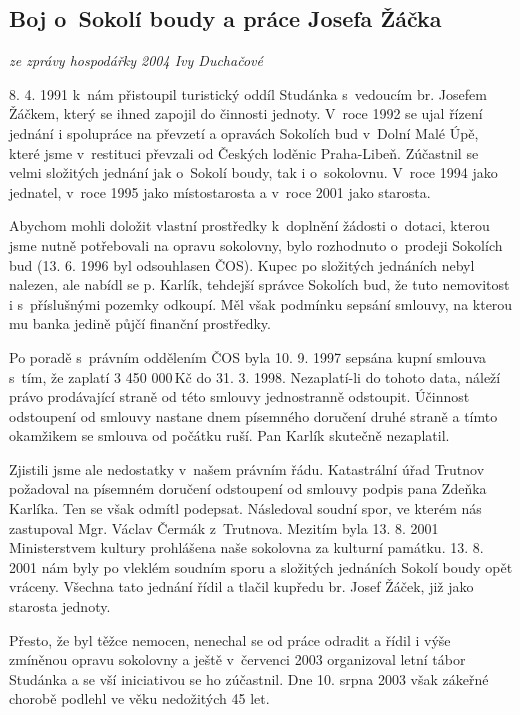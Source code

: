 \documentclass[a5paper, 11pt, twoside]{article}
\begin{document}
\subsection{Boj o~Sokolí boudy a práce Josefa Žáčka}

\begin{center}
  \textit{ze zprávy hospodářky 2004 Ivy Duchačové}
\end{center}

8. 4. 1991 k~nám přistoupil turistický oddíl Studánka s~vedoucím br.
Josefem Žáčkem, který se ihned zapojil do činnosti jednoty. V~roce 1992
se ujal řízení jednání i spolupráce na převzetí a opravách Sokolích bud
v~Dolní Malé Úpě, které jsme v~restituci převzali od Českých loděnic
Praha-Libeň. Zúčastnil se velmi složitých jednání jak o~Sokolí boudy,
tak i o~sokolovnu. V~roce 1994 jako jednatel, v~roce 1995 jako
místostarosta a v~roce 2001 jako starosta.

Abychom mohli doložit vlastní prostředky k~doplnění žádosti o~dotaci,
kterou jsme nutně potřebovali na opravu sokolovny, bylo rozhodnuto
o~prodeji Sokolích bud (13. 6. 1996 byl odsouhlasen ČOS). Kupec po
složitých jednáních nebyl nalezen, ale nabídl se p. Karlík, tehdejší
správce Sokolích bud, že tuto nemovitost i s~příslušnými pozemky
odkoupí. Měl však podmínku sepsání smlouvy, na kterou mu banka jedině
půjčí finanční prostředky.

Po poradě s~právním oddělením ČOS byla 10. 9. 1997 sepsána kupní smlouva
s~tím, že zaplatí 3 450 000\,Kč do 31. 3. 1998. Nezaplatí-li do tohoto
data, náleží právo prodávající straně od této smlouvy jednostranně
odstoupit. Účinnost odstoupení od smlouvy nastane dnem písemného
doručení druhé straně a tímto okamžikem se smlouva od počátku ruší. Pan
Karlík skutečně nezaplatil.

Zjistili jsme ale nedostatky v~našem právním řádu. Katastrální úřad
Trutnov požadoval na písemném doručení odstoupení od smlouvy podpis pana
Zdeňka Karlíka. Ten se však odmítl podepsat. Následoval soudní spor, ve
kterém nás zastupoval Mgr. Václav Čermák z~Trutnova. Mezitím byla 13. 8.
2001 Ministerstvem kultury prohlášena naše sokolovna za kulturní
památku. 13. 8. 2001 nám byly po vleklém soudním sporu a složitých
jednáních Sokolí boudy opět vráceny. Všechna tato jednání řídil a tlačil
kupředu br. Josef Žáček, již jako starosta jednoty.

Přesto, že byl těžce nemocen, nenechal se od práce odradit a řídil i
výše zmíněnou opravu sokolovny a ještě v~červenci 2003 organizoval letní
tábor Studánka a se vší iniciativou se ho zúčastnil. Dne 10. srpna 2003
však zákeřné chorobě podlehl ve věku nedožitých 45 let.
\end{document}
